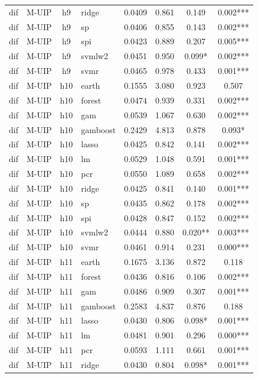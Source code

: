 \begin{ThreePartTable}
\begin{longtable}[t]{llclcccc}
dif & M-UIP & h9 & ridge & 0.0409 & 0.861 & 0.149 & 0.002***\\
dif & M-UIP & h9 & sp & 0.0406 & 0.855 & 0.143 & 0.002***\\
dif & M-UIP & h9 & spi & 0.0423 & 0.889 & 0.207 & 0.005***\\
dif & M-UIP & h9 & svmlw2 & 0.0451 & 0.950 & 0.099* & 0.002***\\
dif & M-UIP & h9 & svmr & 0.0465 & 0.978 & 0.433 & 0.001***\\
\addlinespace
dif & M-UIP & h10 & earth & 0.1555 & 3.080 & 0.923 & 0.507\\
dif & M-UIP & h10 & forest & 0.0474 & 0.939 & 0.331 & 0.002***\\
dif & M-UIP & h10 & gam & 0.0539 & 1.067 & 0.630 & 0.002***\\
dif & M-UIP & h10 & gamboost & 0.2429 & 4.813 & 0.878 & 0.093*\\
dif & M-UIP & h10 & lasso & 0.0425 & 0.842 & 0.141 & 0.002***\\
dif & M-UIP & h10 & lm & 0.0529 & 1.048 & 0.591 & 0.001***\\
dif & M-UIP & h10 & pcr & 0.0550 & 1.089 & 0.658 & 0.002***\\
dif & M-UIP & h10 & ridge & 0.0425 & 0.841 & 0.140 & 0.001***\\
dif & M-UIP & h10 & sp & 0.0435 & 0.862 & 0.178 & 0.002***\\
dif & M-UIP & h10 & spi & 0.0428 & 0.847 & 0.152 & 0.002***\\
dif & M-UIP & h10 & svmlw2 & 0.0444 & 0.880 & 0.020** & 0.003***\\
dif & M-UIP & h10 & svmr & 0.0461 & 0.914 & 0.231 & 0.000***\\
\addlinespace
dif & M-UIP & h11 & earth & 0.1675 & 3.136 & 0.872 & 0.118\\
dif & M-UIP & h11 & forest & 0.0436 & 0.816 & 0.106 & 0.002***\\
dif & M-UIP & h11 & gam & 0.0486 & 0.909 & 0.307 & 0.001***\\
dif & M-UIP & h11 & gamboost & 0.2583 & 4.837 & 0.876 & 0.188\\
dif & M-UIP & h11 & lasso & 0.0430 & 0.806 & 0.098* & 0.001***\\
dif & M-UIP & h11 & lm & 0.0481 & 0.901 & 0.296 & 0.000***\\
dif & M-UIP & h11 & pcr & 0.0593 & 1.111 & 0.661 & 0.001***\\
dif & M-UIP & h11 & ridge & 0.0430 & 0.804 & 0.098* & 0.001***\\

\end{longtable}
\end{ThreePartTable}
